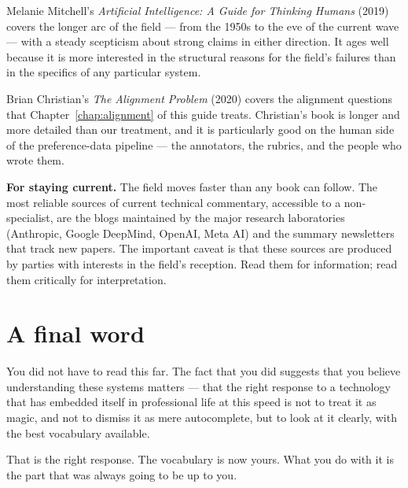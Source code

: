 Melanie Mitchell's \emph{Artificial Intelligence: A Guide
for Thinking Humans} (2019) covers the longer arc of the
field --- from the 1950s to the eve of the current wave ---
with a steady scepticism about strong claims in either
direction. It ages well because it is more interested
in the structural reasons for the field's failures than
in the specifics of any particular system.

Brian Christian's \emph{The Alignment Problem} (2020)
covers the alignment questions that Chapter~\ref{chap:alignment} of this
guide treats. Christian's book is longer and more
detailed than our treatment, and it is particularly good
on the human side of the preference-data pipeline ---
the annotators, the rubrics, and the people who wrote them.

\medskip
\noindent\textbf{For staying current.} The field moves
faster than any book can follow. The most reliable
sources of current technical commentary, accessible to
a non-specialist, are the blogs maintained by the major
research laboratories (Anthropic, Google DeepMind,
OpenAI, Meta AI) and the summary newsletters that track
new papers. The important caveat is that these sources
are produced by parties with interests in the field's
reception. Read them for information; read them critically
for interpretation.

\section*{A final word}

You did not have to read this far. The fact that you did
suggests that you believe understanding these systems
matters --- that the right response to a technology that
has embedded itself in professional life at this speed
is not to treat it as magic, and not to dismiss it as
mere autocomplete, but to look at it clearly, with the
best vocabulary available.

That is the right response. The vocabulary is now yours.
What you do with it is the part that was always going to
be up to you.
